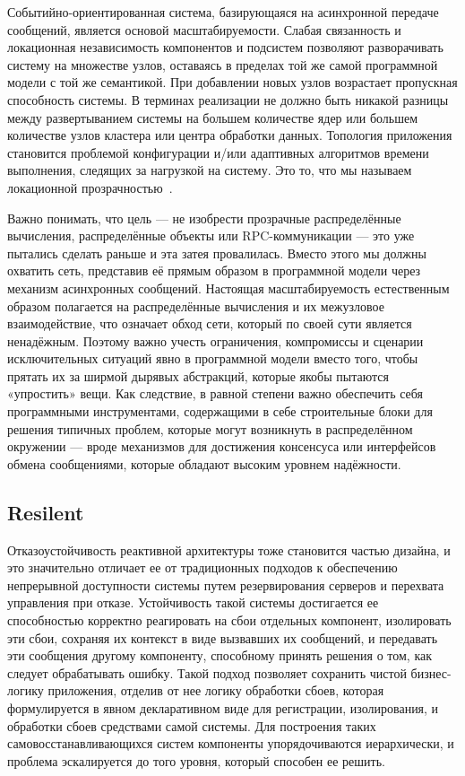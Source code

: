 Событийно-ориентированная система, базирующаяся на асинхронной передаче сообщений, является основой масштабируемости. Слабая связанность и локационная независимость компонентов и подсистем позволяют разворачивать систему на множестве узлов, оставаясь в пределах той же самой программной модели с той же семантикой. При добавлении новых узлов возрастает пропускная способность системы. В терминах реализации не должно быть никакой разницы между развертыванием системы на большем количестве ядер или большем количестве узлов кластера или центра обработки данных. Топология приложения становится проблемой конфигурации и/или адаптивных алгоритмов времени выполнения, следящих за нагрузкой на систему. Это то, что мы называем локационной прозрачностью~\cite{location_transparency}.

Важно понимать, что цель --- не изобрести прозрачные распределённые вычисления, распределённые объекты или RPC-коммуникации --- это уже пытались сделать раньше и эта затея провалилась. Вместо этого мы должны охватить сеть, представив её прямым образом в программной модели через механизм асинхронных сообщений. Настоящая масштабируемость естественным образом полагается на распределённые вычисления и их межузловое взаимодействие, что означает обход сети, который по своей сути является ненадёжным. Поэтому важно учесть ограничения, компромиссы и сценарии исключительных ситуаций явно в программной модели вместо того, чтобы прятать их за ширмой дырявых абстракций, которые якобы пытаются «упростить» вещи. Как следствие, в равной степени важно обеспечить себя программными инструментами, содержащими в себе строительные блоки для решения типичных проблем, которые могут возникнуть в распределённом окружении --- вроде механизмов для достижения консенсуса или интерфейсов обмена сообщениями, которые обладают высоким уровнем надёжности.

\subsection{Resilent}
\label{subsub:domain:reactive_programming:resilent}

Отказоустойчивость реактивной архитектуры тоже становится частью дизайна, и это значительно отличает ее от традиционных подходов к обеспечению непрерывной доступности системы путем резервирования серверов и перехвата управления при отказе. Устойчивость такой системы достигается ее способностью корректно реагировать на сбои отдельных компонент, изолировать эти сбои, сохраняя их контекст в виде вызвавших их сообщений, и передавать эти сообщения другому компоненту, способному принять решения о том, как следует обрабатывать ошибку. Такой подход позволяет сохранить чистой бизнес-логику приложения, отделив от нее логику обработки сбоев, которая формулируется в явном декларативном виде для регистрации, изолирования, и обработки сбоев средствами самой системы. Для построения таких самовосстанавливающихся систем компоненты упорядочиваются иерархически, и проблема эскалируется до того уровня, который способен ее решить.

